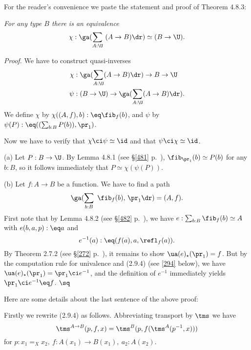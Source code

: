 \documentclass[12pt]{article}
\begin{document}
For the reader's convenience we paste the statement and proof of Theorem 4.8.3:

\nn{} \emph{For any type $B$ there is an equivalence}
$$
\chi:\ga(\sum_{A:\U}\ (A\to B)\dr)\simeq(B\to\U).
$$

\nn\emph{Proof.} We have to construct quasi-inverses
\begin{align*}
\chi&:\ga(\sum_{A:\U}(A\to B)\dr)\to B\to\U\\
\psi&:(B\to\U)\to\ga(\sum_{A:\U}(A\to B)\dr).
\end{align*}
We define $\chi$ by $\chi((A,f),b):\eq\fib_f(b)$, and $\psi$ by $\psi(P):\eq((\sum_{b:B} P(b)),\pr_1)$. 

Now we have to verify that $\chi\ci\psi\simeq\id$ and that $\psi\ci\chi\simeq\id$. 

\nn(a) Let $P:B\to\U$. By Lemma 4.8.1 (see \S\ref{481} p.~\pageref{481}), $\fib_{\pr_1}(b)\simeq P(b)$ for any $b:B$, so it follows immediately that $P\simeq\chi(\psi(P))$.

\nn(b) Let $f:A\to B$ be a function. We have to find a path
$$
\ga(\sum_{b:B}\ \fib_f(b),\,\pr_1\dr)=(A,f).
$$ 
First note that by Lemma 4.8.2 (see \S\ref{482} p.~\pageref{482}), we have $e:\sum_{b:B}\fib_f(b)\simeq A$ with $e(b,a,p):\eq a$ and $$e^{-1}(a):\eq(f(a),a,\refl_f(a)).$$ By Theorem 2.7.2 (see \S\ref{272} p.~\pageref{272}), it remains to show $\ua(e)_\star(\pr_1)=f$. But by the computation rule for univalence and (2.9.4) (see \eqref{294} below), we have $\ua(e)_\star(\pr_1)=\pr_1\ci e^{-1}$, and the definition of $e^{-1}$ immediately yields $\pr_1\ci e^{-1}\eq f$. $\sq$

Here are some details about the last sentence of the above proof: 

Firstly we rewrite (2.9.4) as follows. Abbreviating transport by $\tms$ we have 
\begin{equation}\label{294}
\tms^{A\to B}(p,f,x)=\tms^B(p,f(\tms^A(p^{-1},x)))
\end{equation}
for $p:x_1=_Xx_2,\ f:A(x_1)\to B(x_1),\ a_2:A(x_2)$. 
\end{document}
